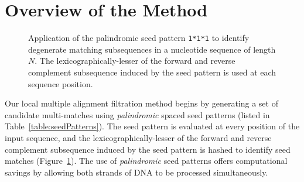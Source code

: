 \documentclass{llncs}
\begin{document}
\section{Overview of the Method}\label{sec:overview}

\begin{figure}[t]
\centering {}
\caption{Application of the palindromic seed pattern
\texttt{1*1*1} to identify degenerate matching subsequences in a
nucleotide sequence of length $N$. The lexicographically-lesser of
the forward and reverse complement subsequence induced by the seed
pattern is used at each sequence position.}

\label{fig:string_matching}\vspace{-0.2cm}
\end{figure}

Our local multiple alignment filtration method begins by generating
a set of candidate multi-matches using \textit{palindromic} spaced
seed patterns (listed in Table~\ref{table:seedPatterns}). The seed
pattern is evaluated at every position of the input sequence, and
the lexicographically-lesser of the forward and reverse complement
subsequence induced by the seed pattern is hashed to identify seed
matches (Figure~\ref{fig:string_matching}).  The use of
\textit{palindromic} seed patterns offers computational savings by
allowing both strands of DNA to be processed simultaneously.
\end{document}

